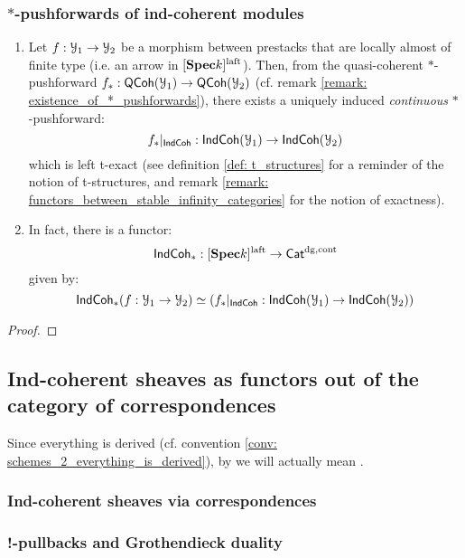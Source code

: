             \subsubsection{\texorpdfstring{$*$}{}-pushforwards of ind-coherent modules}
                \begin{proposition} \label{prop: *_pushforwards_of_ind_coherent_sheaves}
                    \noindent
                    \begin{enumerate}
                        \item Let $f: \mathcal{Y}_1 \to \mathcal{Y}_2$ be a morphism between prestacks that are locally almost of finite type (i.e. an arrow in $[\mathbf{Spec} k]^{\mathrm{laft}}$). Then, from the quasi-coherent $*$-pushforward $f_*: \mathsf{QCoh}(\mathcal{Y}_1) \to \mathsf{QCoh}(\mathcal{Y}_2)$ (cf. remark \ref{remark: existence_of_*_pushforwards}), there exists a uniquely induced \textit{continuous} $*$-pushforward:
                            $$f_*|_{\mathsf{Ind}\mathsf{Coh}}: \mathsf{Ind}\mathsf{Coh}(\mathcal{Y}_1) \to \mathsf{Ind}\mathsf{Coh}(\mathcal{Y}_2)$$
                        which is left t-exact (see definition \ref{def: t_structures} for a reminder of the notion of t-structures, and remark \ref{remark: functors_between_stable_infinity_categories} for the notion of exactness).
                        \item In fact, there is a functor:
                            $$\mathsf{Ind}\mathsf{Coh}_*: [\mathbf{Spec} k]^{\mathrm{laft}} \to \mathsf{Cat}^{\mathrm{dg}, \mathrm{cont}}$$
                        given by:
                            $$\mathsf{Ind}\mathsf{Coh}_*(f: \mathcal{Y}_1 \to \mathcal{Y}_2) \simeq \left(f_*|_{\mathsf{Ind}\mathsf{Coh}}: \mathsf{Ind}\mathsf{Coh}(\mathcal{Y}_1) \to \mathsf{Ind}\mathsf{Coh}(\mathcal{Y}_2)\right)$$
                    \end{enumerate}
                \end{proposition}
                    \begin{proof}
                            
                    \end{proof}
        
        \subsection{Ind-coherent sheaves as functors out of the category of correspondences}
            \begin{convention}
                Since everything is derived (cf. convention \ref{conv: schemes_2_everything_is_derived}), by  we will actually mean .
            \end{convention}
                
            \subsubsection{Ind-coherent sheaves via correspondences}
        
            \subsubsection{!-pullbacks and Grothendieck duality}